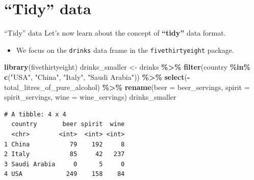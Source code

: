 \documentclass[
  ignorenonframetext,
]{beamer}
\newenvironment{Shaded}{\begin{snugshade}}{\end{snugshade}}
\newcommand{\AttributeTok}[1]{\textcolor[rgb]{0.13,0.29,0.53}{#1}}
\newcommand{\FunctionTok}[1]{\textcolor[rgb]{0.13,0.29,0.53}{\textbf{#1}}}
\newcommand{\NormalTok}[1]{#1}
\newcommand{\OtherTok}[1]{\textcolor[rgb]{0.56,0.35,0.01}{#1}}
\newcommand{\SpecialCharTok}[1]{\textcolor[rgb]{0.81,0.36,0.00}{\textbf{#1}}}
\newcommand{\StringTok}[1]{\textcolor[rgb]{0.31,0.60,0.02}{#1}}
\providecommand{\tightlist}{%
  \setlength{\itemsep}{0pt}\setlength{\parskip}{0pt}}
\begin{document}
\hypertarget{tidy-data}{%
\section{``Tidy'' data}\label{tidy-data}}

\begin{frame}[fragile]{``Tidy'' data}
\protect\hypertarget{tidy-data-1}{}
Let's now learn about the concept of \textbf{``tidy''} data format.

\begin{itemize}
\tightlist
\item
  We focus on the \texttt{drinks} data frame in the
  \texttt{fivethirtyeight} package.
\end{itemize}

\tiny

\begin{Shaded}
\begin{Highlighting}[]
\FunctionTok{library}\NormalTok{(fivethirtyeight)}
\NormalTok{drinks\_smaller }\OtherTok{\textless{}{-}}\NormalTok{ drinks }\SpecialCharTok{\%\textgreater{}\%} 
  \FunctionTok{filter}\NormalTok{(country }\SpecialCharTok{\%in\%} \FunctionTok{c}\NormalTok{(}\StringTok{"USA"}\NormalTok{, }\StringTok{"China"}\NormalTok{, }\StringTok{"Italy"}\NormalTok{, }\StringTok{"Saudi Arabia"}\NormalTok{)) }\SpecialCharTok{\%\textgreater{}\%} 
  \FunctionTok{select}\NormalTok{(}\SpecialCharTok{{-}}\NormalTok{total\_litres\_of\_pure\_alcohol) }\SpecialCharTok{\%\textgreater{}\%} 
  \FunctionTok{rename}\NormalTok{(}\AttributeTok{beer =}\NormalTok{ beer\_servings, }\AttributeTok{spirit =}\NormalTok{ spirit\_servings, }\AttributeTok{wine =}\NormalTok{ wine\_servings)}
\NormalTok{drinks\_smaller}
\end{Highlighting}
\end{Shaded}

\begin{verbatim}
# A tibble: 4 x 4
  country       beer spirit  wine
  <chr>        <int>  <int> <int>
1 China           79    192     8
2 Italy           85     42   237
3 Saudi Arabia     0      5     0
4 USA            249    158    84
\end{verbatim}

\normalsize
\end{frame}
\end{document}
